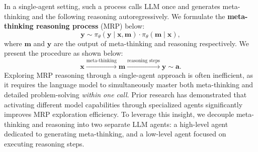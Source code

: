 In a single-agent setting, such a process calls LLM once and generates meta-thinking and the following reasoning autoregressively. We formulate the \textbf{meta-thinking reasoning process} (MRP) below:
\begin{equation}
    \mathbf{y} \sim \pi_\theta(\mathbf{y\mid x, m}) \cdot \pi_\theta(\mathbf{m\mid x}),
    \label{eq:mcp1}
\end{equation} 
where $\mathbf{m}$ and $\mathbf{y}$ are the output of meta-thinking and reasoning respectively. We present the procedure as shown below:
\begin{equation}
    \mathbf{x} \xrightarrow{\text{meta-thinking}} \mathbf{m}
    \xrightarrow{\text{reasoning steps}} \mathbf{y} 
    \sim
    \mathbf{a}.
    \label{eq:mcp2}
\end{equation}
Exploring MRP reasoning through a single-agent approach is often inefficient, as it requires the language model to simultaneously master both meta-thinking and detailed problem-solving \textit{within one call}. Prior research has demonstrated that activating different model capabilities through specialized agents significantly improves MRP exploration efficiency. To leverage this insight, we decouple meta-thinking and reasoning into two separate LLM agents: a high-level agent dedicated to generating meta-thinking, and a low-level agent focused on executing reasoning steps.

